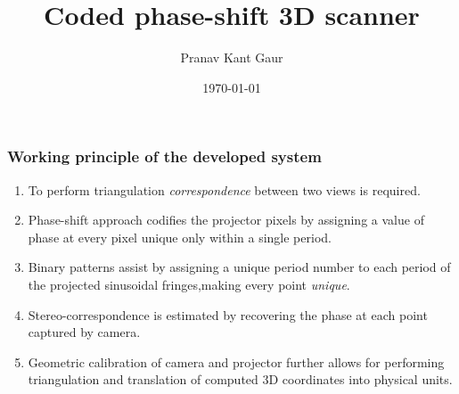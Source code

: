 \documentclass[9pt]{beamer}
\title[Project presentation]{Coded phase-shift 3D scanner}
\author{Pranav Kant Gaur}
\institute[Computer Division]
{
Computer Division \\
\medskip
{\emph{pranav@barc.gov.in}}
}
\date{\today}
\begin{document}
\begin{frame}
\titlepage
\end{frame}

\begin{frame}
\frametitle{Working principle of the developed system}
\begin{enumerate}
\item To perform triangulation \textit{correspondence} between two views is required.
\item Phase-shift approach codifies the projector pixels by assigning a value of phase at every pixel unique only within a single period.
\item Binary patterns assist by assigning a unique period number to each period of the projected sinusoidal fringes,making every point \textit{unique}.
\item Stereo-correspondence is estimated by recovering the phase at each point captured by camera.
\item Geometric calibration of camera and projector further allows for performing triangulation and translation of computed 3D coordinates into physical units.  
\end{enumerate} 
\begin{figure}
\hspace{-1.5cm}
\hspace{1cm}
\end{figure}
\end{frame}
\end{document}
